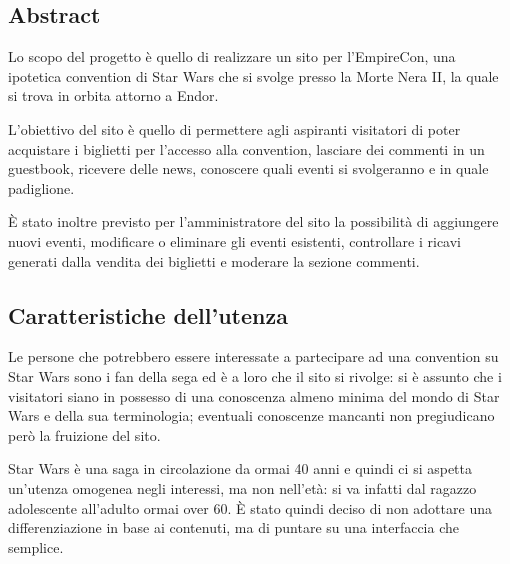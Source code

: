 \subsection{Abstract}
Lo scopo del progetto è quello di realizzare un sito per l'EmpireCon, una ipotetica convention di Star Wars che si svolge presso la Morte Nera II, la quale si trova in orbita attorno a Endor.

L'obiettivo del sito è quello di permettere agli aspiranti visitatori di poter acquistare i biglietti per l'accesso alla convention, lasciare dei commenti in un guestbook, ricevere delle news, conoscere quali eventi si svolgeranno e in quale padiglione.

È stato inoltre previsto per l'amministratore del sito la possibilità di aggiungere nuovi eventi, modificare o eliminare gli eventi esistenti, controllare i ricavi generati dalla vendita dei biglietti e moderare la sezione commenti.

\subsection{Caratteristiche dell’utenza}
Le persone che potrebbero essere interessate a partecipare ad una convention su Star Wars sono i fan della sega ed è a loro che il sito si rivolge: si è assunto che i visitatori siano in possesso di una conoscenza almeno minima del mondo di Star Wars e della sua terminologia; eventuali conoscenze mancanti non pregiudicano però la fruizione del sito.

Star Wars è una saga in circolazione da ormai 40 anni e quindi ci si aspetta un'utenza omogenea negli interessi, ma non nell'età: si va infatti dal ragazzo adolescente all'adulto ormai over 60.
È stato quindi deciso di non adottare una differenziazione in base ai contenuti, ma di puntare su una interfaccia che semplice.

